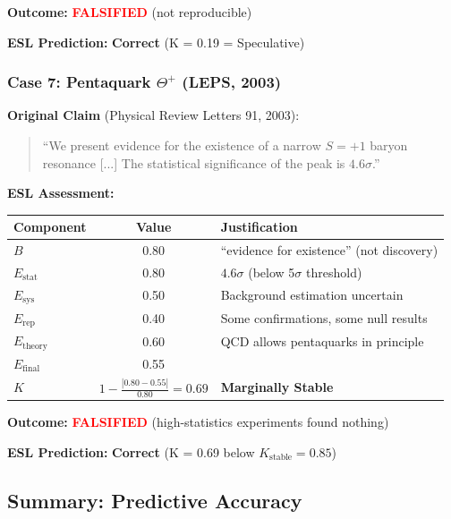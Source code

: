 \documentclass[11pt,a4paper]{article}
\begin{document}
\textbf{Outcome:} \textcolor{red}{\textbf{FALSIFIED}} (not reproducible)

\textbf{ESL Prediction:} \checkmark \textbf{Correct} (K = 0.19 = Speculative)

\subsubsection{Case 7: Pentaquark $\Theta^+$ (LEPS, 2003)}

\textbf{Original Claim} (Physical Review Letters 91, 2003):
\begin{quote}
``We present evidence for the existence of a narrow $S = +1$ baryon resonance [...] The statistical significance of the peak is $4.6\sigma$.''
\end{quote}

\textbf{ESL Assessment:}
\begin{center}
\begin{tabular}{lcl}
\toprule
\textbf{Component} & \textbf{Value} & \textbf{Justification} \\
\midrule
$B$ & 0.80 & ``evidence for existence'' (not discovery) \\
$E_{\text{stat}}$ & 0.80 & $4.6\sigma$ (below 5$\sigma$ threshold) \\
$E_{\text{sys}}$ & 0.50 & Background estimation uncertain \\
$E_{\text{rep}}$ & 0.40 & Some confirmations, some null results \\
$E_{\text{theory}}$ & 0.60 & QCD allows pentaquarks in principle \\
\midrule
$E_{\text{final}}$ & 0.55 & \\
\midrule
$K$ & $1 - \frac{|0.80 - 0.55|}{0.80} = 0.69$ & \textbf{Marginally Stable} \\
\bottomrule
\end{tabular}
\end{center}

\textbf{Outcome:} \textcolor{red}{\textbf{FALSIFIED}} (high-statistics experiments found nothing)

\textbf{ESL Prediction:} \checkmark \textbf{Correct} (K = 0.69 below $K_{\text{stable}} = 0.85$)

\subsection{Summary: Predictive Accuracy}
\end{document}
